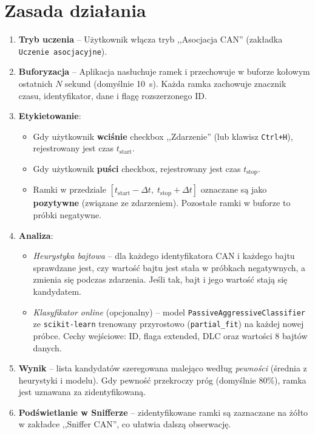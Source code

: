\documentclass[a4paper,12pt]{article}
\begin{document}
\section{Zasada działania}
\begin{enumerate}[noitemsep]
    \item \textbf{Tryb uczenia} – Użytkownik włącza tryb ,,Asocjacja CAN'' (zakładka \texttt{Uczenie asocjacyjne}).
    \item \textbf{Buforyzacja} – Aplikacja nasłuchuje ramek i przechowuje w buforze kołowym ostatnich $N$ sekund (domyślnie 10~s). Każda ramka zachowuje znacznik czasu, identyfikator, dane i flagę rozszerzonego ID.
    \item \textbf{Etykietowanie}:
        \begin{itemize}
            \item Gdy użytkownik \textbf{wciśnie} checkbox ,,Zdarzenie'' (lub klawisz \texttt{Ctrl+H}), rejestrowany jest czas $t_{\text{start}}$.
            \item Gdy użytkownik \textbf{puści} checkbox, rejestrowany jest czas $t_{\text{stop}}$.
            \item Ramki w przedziale $[t_{\text{start}}-\Delta t,\; t_{\text{stop}}+\Delta t]$ oznaczane są jako \textbf{pozytywne} (związane ze zdarzeniem). Pozostałe ramki w buforze to próbki negatywne.
        \end{itemize}
    \item \textbf{Analiza}:
        \begin{itemize}
            \item \emph{Heurystyka bajtowa} – dla każdego identyfikatora CAN i każdego bajtu sprawdzane jest, czy wartość bajtu jest stała w próbkach negatywnych, a zmienia się podczas zdarzenia. Jeśli tak, bajt i jego wartość stają się kandydatem.
            \item \emph{Klasyfikator online} (opcjonalny) – model \texttt{PassiveAggressiveClassifier} ze \texttt{scikit-learn} trenowany przyrostowo (\texttt{partial\_fit}) na każdej nowej próbce. Cechy wejściowe: ID, flaga extended, DLC oraz wartości 8 bajtów danych.
        \end{itemize}
    \item \textbf{Wynik} – lista kandydatów szeregowana malejąco według \emph{pewności} (średnia z heurystyki i modelu). Gdy pewność przekroczy próg (domyślnie 80\%), ramka jest uznawana za zidentyfikowaną.
    \item \textbf{Podświetlanie w Snifferze} – zidentyfikowane ramki są zaznaczane na żółto w zakładce ,,Sniffer CAN'', co ułatwia dalszą obserwację.
\end{enumerate}
\end{document}
